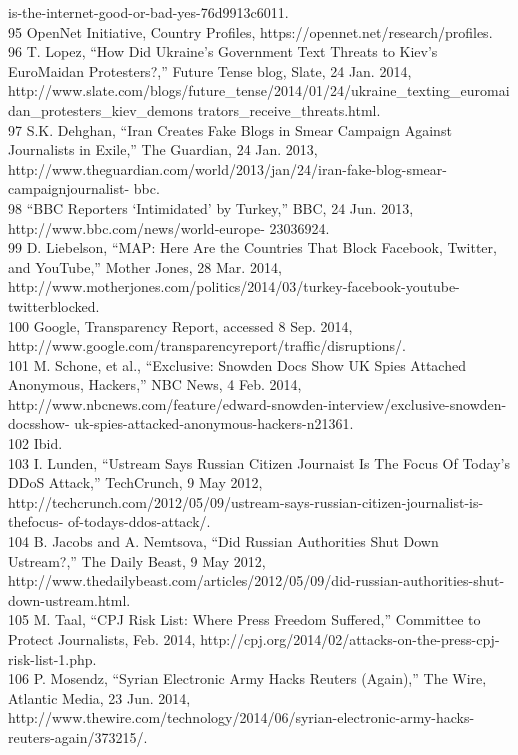 is-the-internet-good-or-bad-yes-76d9913c6011.\\
95 OpenNet Initiative, Country Profiles, https://opennet.net/research/profiles.\\
96 T. Lopez, ``How Did Ukraine’s Government Text Threats to Kiev’s EuroMaidan Protesters?,'' Future
Tense blog, Slate, 24 Jan. 2014,
http://www.slate.com/blogs/future_tense/2014/01/24/ukraine_texting_euromaidan_protesters_kiev_demons
trators_receive_threats.html.\\
97 S.K. Dehghan, ``Iran Creates Fake Blogs in Smear Campaign Against Journalists in Exile,'' The
Guardian, 24 Jan. 2013, http://www.theguardian.com/world/2013/jan/24/iran-fake-blog-smear-campaignjournalist-
bbc.\\
98 ``BBC Reporters ‘Intimidated’ by Turkey,'' BBC, 24 Jun. 2013, http://www.bbc.com/news/world-europe-
23036924.\\
99 D. Liebelson, ``MAP: Here Are the Countries That Block Facebook, Twitter, and YouTube,'' Mother
Jones, 28 Mar. 2014, http://www.motherjones.com/politics/2014/03/turkey-facebook-youtube-twitterblocked.\\
100 Google, Transparency Report, accessed 8 Sep. 2014,
http://www.google.com/transparencyreport/traffic/disruptions/.\\
101 M. Schone, et al., ``Exclusive: Snowden Docs Show UK Spies Attached Anonymous, Hackers,'' NBC
News, 4 Feb. 2014, http://www.nbcnews.com/feature/edward-snowden-interview/exclusive-snowden-docsshow-
uk-spies-attacked-anonymous-hackers-n21361.\\
102 Ibid.\\
103 I. Lunden, ``Ustream Says Russian Citizen Journaist Is The Focus Of Today’s DDoS Attack,''
TechCrunch, 9 May 2012, http://techcrunch.com/2012/05/09/ustream-says-russian-citizen-journalist-is-thefocus-
of-todays-ddos-attack/.\\
104 B. Jacobs and A. Nemtsova, ``Did Russian Authorities Shut Down Ustream?,'' The Daily Beast, 9 May
2012, http://www.thedailybeast.com/articles/2012/05/09/did-russian-authorities-shut-down-ustream.html.\\
105 M. Taal, ``CPJ Risk List: Where Press Freedom Suffered,'' Committee to Protect Journalists, Feb. 2014,
http://cpj.org/2014/02/attacks-on-the-press-cpj-risk-list-1.php.\\
106 P. Mosendz, ``Syrian Electronic Army Hacks Reuters (Again),'' The Wire, Atlantic Media, 23 Jun. 2014,
http://www.thewire.com/technology/2014/06/syrian-electronic-army-hacks-reuters-again/373215/.\\
